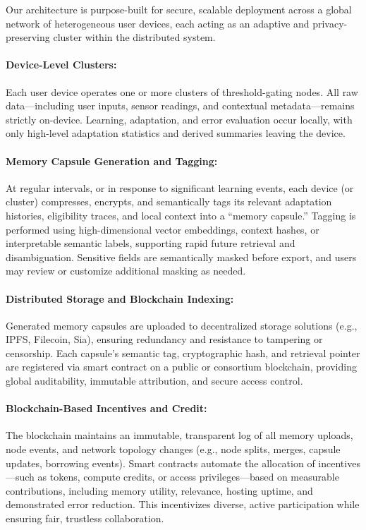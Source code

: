 \documentclass[11pt]{article}
\begin{document}
Our architecture is purpose-built for secure, scalable deployment across a global network of heterogeneous user devices, each acting as an adaptive and privacy-preserving cluster within the distributed system.

\paragraph{Device-Level Clusters:}
Each user device operates one or more clusters of threshold-gating nodes. All raw data—including user inputs, sensor readings, and contextual metadata—remains strictly on-device. Learning, adaptation, and error evaluation occur locally, with only high-level adaptation statistics and derived summaries leaving the device.

\paragraph{Memory Capsule Generation and Tagging:}
At regular intervals, or in response to significant learning events, each device (or cluster) compresses, encrypts, and semantically tags its relevant adaptation histories, eligibility traces, and local context into a “memory capsule.” Tagging is performed using high-dimensional vector embeddings, context hashes, or interpretable semantic labels, supporting rapid future retrieval and disambiguation. Sensitive fields are semantically masked before export, and users may review or customize additional masking as needed.

\paragraph{Distributed Storage and Blockchain Indexing:}
Generated memory capsules are uploaded to decentralized storage solutions (e.g., IPFS, Filecoin, Sia), ensuring redundancy and resistance to tampering or censorship. Each capsule’s semantic tag, cryptographic hash, and retrieval pointer are registered via smart contract on a public or consortium blockchain, providing global auditability, immutable attribution, and secure access control.

\paragraph{Blockchain-Based Incentives and Credit:}
The blockchain maintains an immutable, transparent log of all memory uploads, node events, and network topology changes (e.g., node splits, merges, capsule updates, borrowing events). Smart contracts automate the allocation of incentives—such as tokens, compute credits, or access privileges—based on measurable contributions, including memory utility, relevance, hosting uptime, and demonstrated error reduction. This incentivizes diverse, active participation while ensuring fair, trustless collaboration.
\end{document}
